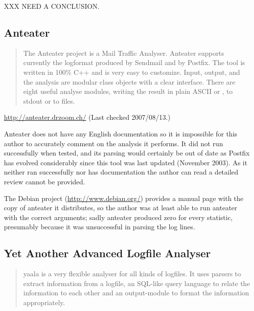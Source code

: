 XXX NEED A CONCLUSION\@.

\subsection{Anteater}

\begin{quotation}

    The Anteater project is a Mail Traffic Analyser. Anteater supports
    currently the logformat produced by Sendmail and by Postfix. The tool
    is written in 100\% C++ and is very easy to customize. Input, output,
    and the analysis are modular class objects with a clear interface.
    There are eight useful analyse modules, writing the result in plain
    ASCII or \HTML{}, to stdout or to files.

\end{quotation}

\noindent{}\url{http://anteater.drzoom.ch/} \newline{}
(Last checked 2007/08/13.)

Anteater does not have any English documentation so it is impossible for
this author to accurately comment on the analysis it performs.  It did not
run successfully when tested, and its parsing would certainly be out of
date as Postfix has evolved considerably since this tool was last updated
(November 2003).  As it neither ran successfully nor has documentation the
author can read a detailed review cannot be provided.

The Debian project (\url{http://www.debian.org/}) provides a manual page
with the copy of anteater it distributes, so the author was at least able
to run anteater with the correct arguments; sadly anteater produced zero
for every statistic, presumably because it was unsuccessful in parsing the
log lines.

\subsection{Yet Another Advanced Logfile Analyser}

\begin{quotation}

    yaala is a very flexible analyser for all kinds of logfiles. It uses
    parsers to extract information from a logfile, an SQL-like query
    language to relate the information to each other and an output-module
    to format the information appropriately.

\end{quotation}

